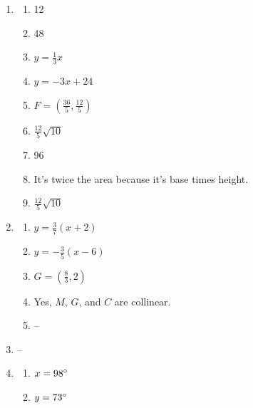 \documentclass{article}
\begin{document}
\begin{enumerate}
\item

	\begin{enumerate}
	
	\item 12
	
	\item 48
	
	\item $y = \frac{1}{3}x$
	
	\item $y = -3x + 24$
	
	\item $F = (\frac{36}{5}, \frac{12}{5})$
	
	\item $\frac{12}{5} \sqrt{10}$
	
	\item 96
	
	\item It's twice the area because it's base times height.
	
	\item $\frac{12}{5} \sqrt{10}$
	
	\end{enumerate}
	
\item

	\begin{enumerate}
	
	\item $y = \frac{3}{7} (x + 2)$
	
	\item $y = -\frac{3}{5} (x - 6)$
	
	\item $G = (\frac{8}{3}, 2)$
	
	\item Yes, $M$, $G$, and $C$ are collinear.
	
	\item --
	
	\end{enumerate}
	
\item --

\item

	\begin{enumerate}
	
	\item $x = 98 \degree$
	
	\item $y = 73 \degree$
	

\end{enumerate}
\end{enumerate}
\end{document}
